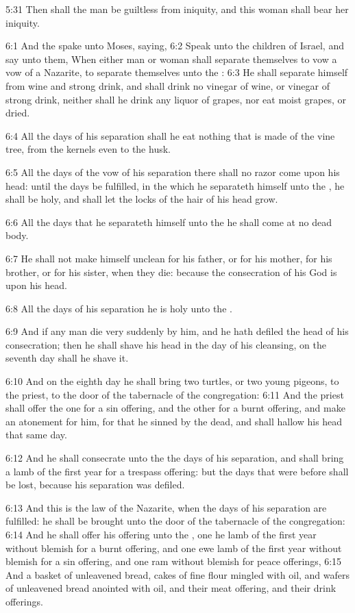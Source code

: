 5:31 Then shall the man be guiltless from iniquity, and this woman
shall bear her iniquity.

6:1 And the \LORD spake unto Moses, saying, 6:2 Speak unto the children
of Israel, and say unto them, When either man or woman shall separate
themselves to vow a vow of a Nazarite, to separate themselves unto the
\LORD: 6:3 He shall separate himself from wine and strong drink, and
shall drink no vinegar of wine, or vinegar of strong drink, neither
shall he drink any liquor of grapes, nor eat moist grapes, or dried.

6:4 All the days of his separation shall he eat nothing that is made
of the vine tree, from the kernels even to the husk.

6:5 All the days of the vow of his separation there shall no razor
come upon his head: until the days be fulfilled, in the which he
separateth himself unto the \LORD, he shall be holy, and shall let the
locks of the hair of his head grow.

6:6 All the days that he separateth himself unto the \LORD he shall
come at no dead body.

6:7 He shall not make himself unclean for his father, or for his
mother, for his brother, or for his sister, when they die: because the
consecration of his God is upon his head.

6:8 All the days of his separation he is holy unto the \LORD.

6:9 And if any man die very suddenly by him, and he hath defiled the
head of his consecration; then he shall shave his head in the day of
his cleansing, on the seventh day shall he shave it.

6:10 And on the eighth day he shall bring two turtles, or two young
pigeons, to the priest, to the door of the tabernacle of the
congregation: 6:11 And the priest shall offer the one for a sin
offering, and the other for a burnt offering, and make an atonement
for him, for that he sinned by the dead, and shall hallow his head
that same day.

6:12 And he shall consecrate unto the \LORD the days of his separation,
and shall bring a lamb of the first year for a trespass offering: but
the days that were before shall be lost, because his separation was
defiled.

6:13 And this is the law of the Nazarite, when the days of his
separation are fulfilled: he shall be brought unto the door of the
tabernacle of the congregation: 6:14 And he shall offer his offering
unto the \LORD, one he lamb of the first year without blemish for a
burnt offering, and one ewe lamb of the first year without blemish for
a sin offering, and one ram without blemish for peace offerings, 6:15
And a basket of unleavened bread, cakes of fine flour mingled with
oil, and wafers of unleavened bread anointed with oil, and their meat
offering, and their drink offerings.

